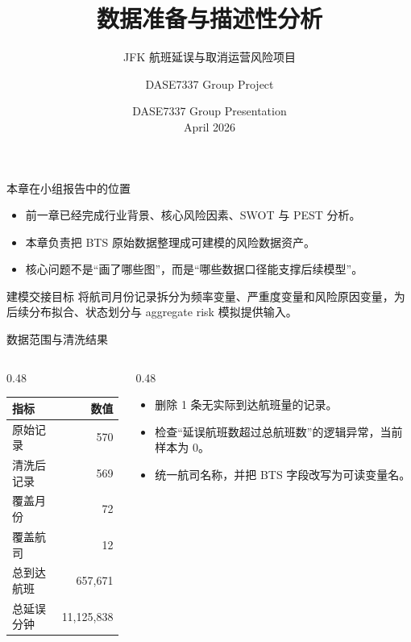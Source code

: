 \documentclass[UTF8,fontset=fandol,10pt,aspectratio=169]{ctexbeamer}
\title[The University of Hong Kong]{数据准备与描述性分析}
\subtitle{JFK 航班延误与取消运营风险项目}
\author[DASE7337 Group Project]{DASE7337 Group Project}
\institute[HKU]{The University of Hong Kong}
\date[April 2026]{DASE7337 Group Presentation \\ April 2026}
\begin{document}
\begin{frame}
  \titlepage
\end{frame}

\begin{frame}{本章在小组报告中的位置}
  \begin{itemize}
    \item 前一章已经完成行业背景、核心风险因素、SWOT 与 PEST 分析。
    \item 本章负责把 BTS 原始数据整理成可建模的风险数据资产。
    \item 核心问题不是“画了哪些图”，而是“哪些数据口径能支撑后续模型”。
  \end{itemize}
  \vspace{0.4em}
  \begin{block}{建模交接目标}
  将航司月份记录拆分为频率变量、严重度变量和风险原因变量，为后续分布拟合、状态划分与 aggregate risk 模拟提供输入。
  \end{block}
\end{frame}

\begin{frame}{数据范围与清洗结果}
  \begin{columns}[T,totalwidth=\linewidth]
    \begin{column}{0.48\linewidth}
      \begin{table}
      \small
      \begin{tabular}{lr}
      \toprule
      指标 & 数值 \\
      \midrule
      原始记录 & 570 \\
      清洗后记录 & 569 \\
      覆盖月份 & 72 \\
      覆盖航司 & 12 \\
      总到达航班 & 657,671 \\
      总延误分钟 & 11,125,838 \\
      \bottomrule
      \end{tabular}
      \end{table}
    \end{column}
    \begin{column}{0.48\linewidth}
      \begin{itemize}
        \item 删除 1 条无实际到达航班量的记录。
        \item 检查“延误航班数超过总航班数”的逻辑异常，当前样本为 0。
        \item 统一航司名称，并把 BTS 字段改写为可读变量名。
      \end{itemize}
    \end{column}
  \end{columns}
\end{frame}
\end{document}
